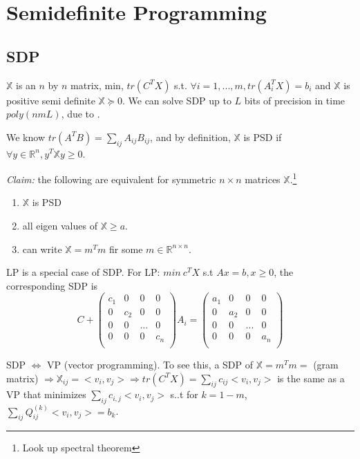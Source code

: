 \documentclass[11pt]{article}
\begin{document}
\section{Semidefinite Programming}
\subsection{SDP}

$\mathbb{X}$ is an $n$ by $n$ matrix, min, $tr(C^TX)$ s.t. $\forall i=1,...,m, tr(A_i^TX) = b_i$ and $\mathbb{X}$ is positive semi definite $\mathbb{X} \succeq 0$. We can solve SDP up to $L$ bits of precision in time $poly(nmL)$, due to \cite{SDP}.

We know $tr(A^TB) = \sum_{ij}A_{ij}B_{ij}$, and by definition, $\mathbb{X}$ is PSD if $\forall y \in \mathbb{R}^n, y^T \mathbb{X} y \ge 0$.

{\em Claim:} the following are equivalent for symmetric $n\times n$ matrices $\mathbb{X}$.\footnote{Look up spectral theorem}

\begin{enumerate}
\item $\mathbb{X}$ is PSD
\item all eigen values of $\mathbb{X} \ge a$. 
\item can write $\mathbb{X} = m^Tm$ fir some $m \in \mathbb{R}^{n\times n}$.
\end{enumerate}

LP is a special case of SDP. For LP:  $min~c^TX$ s.t $Ax = b, x\ge 0$, the corresponding SDP is
$$C + \left( \begin{array}{cccc}
c_1 & 0 & 0 & 0\\
0 & c_2 & 0 & 0\\
0 & 0 & ...& 0\\
0 & 0 & 0 & c_n \\
 \end{array} \right) A_i=\left( \begin{array}{cccc}
a_1 & 0 & 0 & 0\\
0 & a_2 & 0 & 0\\
0 & 0 & ...& 0\\
0 & 0 & 0 & a_n \\
 \end{array} \right) $$

SDP $\iff$ VP (vector programming). To see this, a SDP of $\mathbb{X} = m^Tm = $ (gram matrix) $\Rightarrow \mathbb{X}_{ij} = <v_i,v_j> \Rightarrow tr(C^TX) = \sum_{ij} c_{ij} <v_i,v_j>$ is the same as a VP that minimizes $\sum_{ij}c_{i,j}<v_i,v_j>$ s..t for $k=1-m$, $\sum_{ij} Q_{ij}^{(k)} <v_i,v_j> = b_k$.
\end{document}
